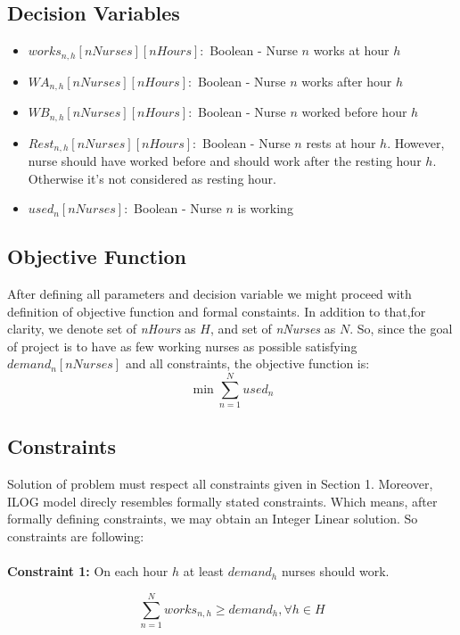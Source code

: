 \documentclass{article}
\newcommand\tab[1][1cm]{\hspace*{#1}}
\begin{document}
	\subsection{Decision Variables}
	\begin{itemize}
		\item $works_{n,h}[nNurses][nHours]:$ Boolean - Nurse $n$ works at hour $h$
		\item $WA_{n,h}[nNurses][nHours]:$ Boolean - Nurse $n$ works after hour $h$
		\item $WB_{n,h}[nNurses][nHours]:$ Boolean - Nurse $n$ worked before hour $h$
		\item $Rest_{n,h}[nNurses][nHours]:$ Boolean - Nurse $n$ rests at hour $h$. However, nurse should have worked before and should work after the resting hour $h$. Otherwise it's not considered as resting hour.
		\item $used_n[nNurses]:$ Boolean - Nurse $n$ is working
	\end{itemize}
	
	\subsection{Objective Function}
\tab After defining all parameters and decision variable we might proceed with definition of objective function and formal constaints. In addition to that,for clarity, we denote set of \textit{nHours} as $H$, and set of \textit{nNurses} as $N$. So, since the goal of project is to have as few working nurses as possible satisfying $demand_n[nNurses]$ and all constraints, the objective function is:
\begin{equation}
	\min \sum_{n=1}^N used_n 
\end{equation}
	\subsection{Constraints}
\tab Solution of problem must respect all constraints given in Section 1. Moreover, ILOG model direcly resembles formally stated constraints. Which means, after formally defining constraints, we may obtain an Integer Linear solution. So constraints are following:\\\\

\tab \textbf{Constraint 1:} On each hour $h$ at least $demand_h$ nurses should work.\\
\begin{minipage}{\linewidth}
	\begin{equation}
		\sum_{n=1}^N works_{n,h} \geq demand_h, \forall h \in H
	\end{equation}
\end{minipage}
\end{document}
